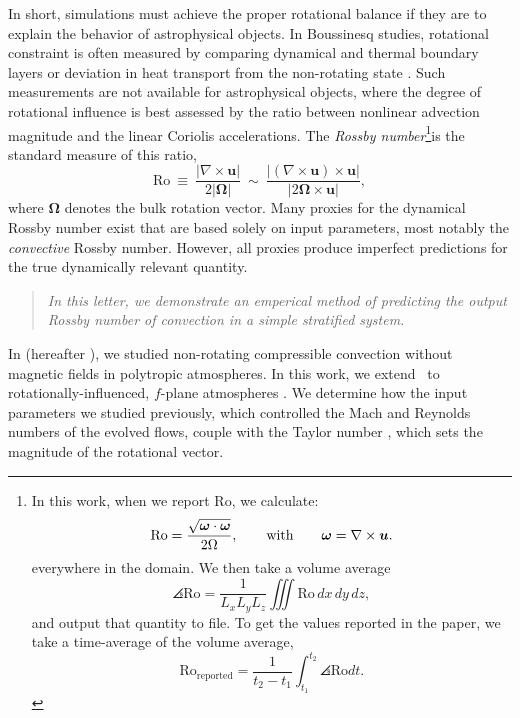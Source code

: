 In short, simulations must achieve the proper rotational balance if they are to explain 
the behavior of astrophysical objects. 
In Boussinesq studies, rotational constraint is often measured by comparing
dynamical and thermal boundary layers or deviation in heat transport from the non-rotating
state \citep{king&all2012, julien&all2012, king&all2013}. 
Such measurements are not available for astrophysical objects, where
the degree of rotational influence is best assessed by the ratio between 
nonlinear advection magnitude and the linear Coriolis accelerations. 
The \textit{Rossby number}\footnote{
In this work, when we report Ro, we calculate:
$$
\text{Ro} = \frac{\sqrt{\bm{\omega}\cdot\bm{\omega}}}{2 \Omega},
\qquad\text{with}\qquad
\bm{\omega} = \nabla\times\bm{u}.
$$
everywhere in the domain.
We then take a volume average
$$
\angles{\text{Ro}} = \frac{1}{L_x L_y L_z}\iiint \text{Ro}\,dx\,dy\,dz,
$$
and output that quantity to file.
To get the values reported in the paper, we take a time-average of the volume average,
$$
\text{Ro}_{\text{reported}} = \frac{1}{t_2 - t_1}\int_{t_1}^{t_2} \angles{\text{Ro}} dt.
$$

}is the standard measure of this ratio, 
\begin{equation}
\text{Ro} \ \equiv \ \frac{| \nabla \times \boldsymbol{u} | }{2 |\bm{\Omega}|} \ 
\sim \ \frac{| (\nabla \times \boldsymbol{u}) \times \boldsymbol{u}  | }{|2 \bm{\Omega} \times \boldsymbol{u}|},
\label{eqn:ro_p19_rossby-def}
\end{equation}
where $\bm{\Omega}$ denotes the bulk rotation vector. 
Many proxies for the dynamical Rossby number exist that are based solely on input parameters, most notably the \textit{convective} Rossby number. 
However, all proxies produce imperfect predictions for the true dynamically relevant quantity.
\begin{quote}
\emph{In this letter, we demonstrate an emperical method of predicting the output Rossby number
of convection in a simple stratified system.}
\end{quote}
In \cite{anders&brown2017} (hereafter \AB), we studied non-rotating compressible convection without magnetic fields in polytropic atmospheres. 
In this work, we extend \AB$\,$ to rotationally-influenced, $f$-plane
atmospheres 
\citep[e.g.,][]{brummell&all1996, brummell&all1998, calkins&all2015a}. 
We determine how the input parameters we studied previously, which controlled the Mach and
Reynolds numbers of the evolved flows, couple with the Taylor number \citep[Ta,][]{julien&all1996}, which sets the magnitude of the rotational vector. 

